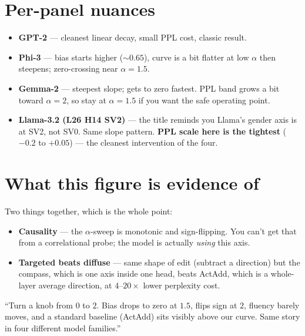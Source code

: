 \documentclass[11pt]{article}
\begin{document}
\section*{Per-panel nuances}
\begin{itemize}
    \item \textbf{GPT-2} --- cleanest linear decay, small PPL cost, classic result.
    \item \textbf{Phi-3} --- bias starts higher ($\sim 0.65$), curve is a bit flatter at low $\alpha$ then steepens; zero-crossing near $\alpha{=}1.5$.
    \item \textbf{Gemma-2} --- steepest slope; gets to zero fastest. PPL band grows a bit toward $\alpha{=}2$, so stay at $\alpha{=}1.5$ if you want the safe operating point.
    \item \textbf{Llama-3.2 (L26 H14 SV2)} --- the title reminds you Llama's gender axis is at SV2, not SV0. Same slope pattern. \textbf{PPL scale here is the tightest} ($-0.2$ to $+0.05$) --- the cleanest intervention of the four.
\end{itemize}

\section*{What this figure is evidence of}
Two things together, which is the whole point:
\begin{itemize}
    \item \textbf{Causality} --- the $\alpha$-sweep is monotonic and sign-flipping. You can't get that from a correlational probe; the model is actually \emph{using} this axis.
    \item \textbf{Targeted beats diffuse} --- same shape of edit (subtract a direction) but the compass, which is one axis inside one head, beats ActAdd, which is a whole-layer average direction, at $4\text{--}20\times$ lower perplexity cost.
\end{itemize}

\begin{tcolorbox}[cue, title=One-line version for a standup]
``Turn a knob from $0$ to $2$. Bias drops to zero at $1.5$, flips sign at
$2$, fluency barely moves, and a standard baseline (ActAdd) sits visibly
above our curve. Same story in four different model families.''
\end{tcolorbox}
\end{document}
